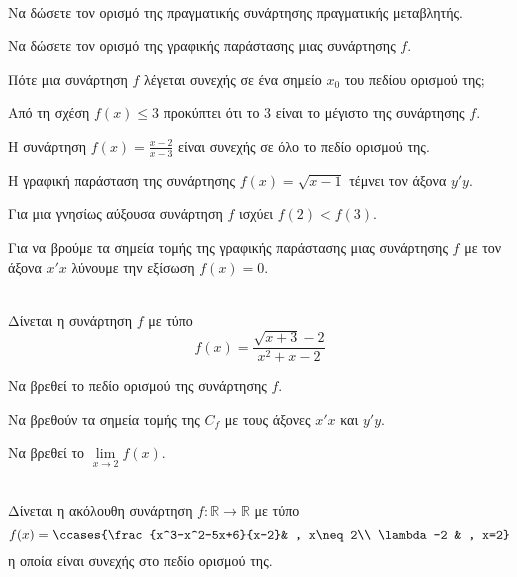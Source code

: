 \documentclass[twoside,nofonts,ektypwsh]{frontisthrio-diag}
\begin{document}
\begin{thema}
\item\mbox{}\\\vspace{-7mm}
\begin{erwthma}
\item Να δώσετε τον ορισμό της πραγματικής συνάρτησης πραγματικής μεταβλητής.
\item Να δώσετε τον ορισμό της γραφικής παράστασης μιας συνάρτησης $ f $.
\item Πότε μια συνάρτηση $ f $ λέγεται συνεχής σε ένα σημείο $ x_0 $ του πεδίου ορισμού της;
\item \swstolathos
\begin{alist}
\item Από τη σχέση $ f(x)\leq 3 $ προκύπτει ότι το $ 3 $ είναι το μέγιστο της συνάρτησης $ f $.
\item Η συνάρτηση $ f(x)=\frac{x-2}{x-3} $ είναι συνεχής σε όλο το πεδίο ορισμού της.
\item Η γραφική παράσταση της συνάρτησης $ f(x)=\sqrt{x-1} $ τέμνει τον άξονα $ y'y $.
\item Για μια γνησίως αύξουσα συνάρτηση $ f $ ισχύει $ f(2)<f(3) $.
\item Για να βρούμε τα σημεία τομής της γραφικής παράστασης μιας συνάρτησης $ f $ με τον άξονα $ x'x $ λύνουμε την εξίσωση $ f(x)=0 $.
\end{alist}
\end{erwthma}
\item\mbox{}\\
Δίνεται η συνάρτηση $ f $ με τύπο
\[ f(x)=\frac{\sqrt{x+3}-2}{x^2+x-2} \]
\begin{erwthma}
\item Να βρεθεί το πεδίο ορισμού της συνάρτησης $ f $.
\item Να βρεθούν τα σημεία τομής της $ C_f $ με τους άξονες $ x'x $ και $ y'y $.
\item Να βρεθεί το $ \lim\limits_{x\to 2}f(x) $.
\end{erwthma}
\item\mbox{}\\
Δίνεται η ακόλουθη συνάρτηση $ f:\mathbb{R}\to\mathbb{R} $ με τύπο
\[ f(x)=\ccases{\frac{x^3-x^2-5x+6}{x-2}& , x\neq 2\\
\lambda-2 & , x=2} \]
η οποία είναι συνεχής στο πεδίο ορισμού της.
\begin{erwthma}

\end{erwthma}
\end{thema}
\end{document}
